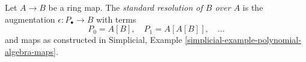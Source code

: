 \begin{definition}
\label{definition-standard-resolution}
Let $A \to B$ be a ring map. The {\it standard resolution of $B$ over $A$}
is the augmentation $\epsilon : P_\bullet \to B$ with terms
$$
P_0 = A[B],\quad P_1 = A[A[B]],\quad \ldots
$$
and maps as constructed in
Simplicial, Example \ref{simplicial-example-polynomial-algebra-maps}.
\end{definition}